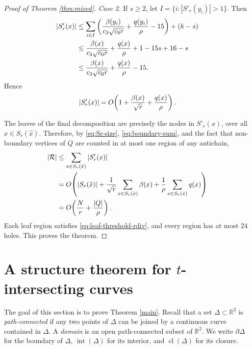 \documentclass[11pt]{article}
\theoremstyle{plain}
\theoremstyle{definition}
\theoremstyle{remark}
\begin{document}
\begin{proof}[Proof of Theorem \ref{thm:mixed}]
\noindent \emph{Case 2.} If \(s\ge 2\), let $I=\{i:|S'_r(y_i)|>1\}.$  Then
\[
\begin{aligned}
|S'_r(x)|
&\le
\sum_{i\in I}\left(
{\beta(y_i)\over c_3\sqrt{c_0r}}
+{q(y_i)\over\rho}-15
\right)+(k-s)\\
&\le
{\beta(x)\over c_3\sqrt{c_0r}}
+{q(x)\over\rho}
+1-15s+16-s\\
&\le
{\beta(x)\over c_3\sqrt{c_0r}}
+{q(x)\over\rho}-15.
\end{aligned}
\]
Hence
\[
|S'_r(x)|
=
O\!\left(
1+{\beta(x)\over\sqrt r}+{q(x)\over\rho}
\right).
\]






The leaves of the final decomposition are precisely the nodes in \(S'_r(x)\), over all \(x\in S_r(\hat x)\). Therefore, by \eqref{eq:Sr-size}, \eqref{eq:boundary-sum}, and the fact that non-boundary vertices of \(Q\) are counted in at most one region of any antichain,
\begin{align*}
|\mathcal R|
&\le \sum_{x\in S_r(\hat x)} |S'_r(x)| \\
&=
O\!\left(
|S_r(\hat x)|
+{1\over \sqrt r}\sum_{x\in S_r(\hat x)}\beta(x)
+{1\over \rho}\sum_{x\in S_r(\hat x)}q(x)
\right)\\
&=
O\!\left({N\over r}+{|Q|\over \rho}\right).
\end{align*}
Each leaf region satisfies \eqref{eq:leaf-threshold-rdiv}, and every region has at most \(24\) holes. This proves the theorem.
\end{proof}
























\section{A structure theorem for $t$-intersecting curves}\label{sec:intersecting}


The goal of this section is to prove Theorem \ref{main}.  Recall that a set \(\Delta\subset \mathbb R^2\) is \emph{path-connected} if any two
points of \(\Delta\) can be joined by a continuous curve contained in
\(\Delta\).  A \emph{domain} is an open path-connected subset of
\(\mathbb R^2\).  We write \(\partial\Delta\) for the boundary of
\(\Delta\), \(\operatorname{int}(\Delta)\) for its interior, and $\operatorname{cl}(\Delta)$ for its closure.
\end{document}
